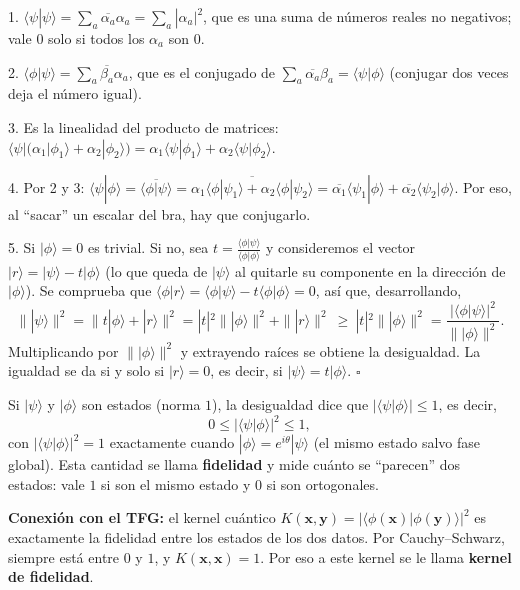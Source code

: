 \documentclass[11pt, a4paper, twoside, openright]{report}
\begin{document}
\begin{tcolorbox}[colback=gray!5!white,colframe=gray!75!black,title=\textbf{Demostración}]
1. $\langle\psi|\psi\rangle = \sum_a\overline{\alpha_a}\alpha_a = \sum_a|\alpha_a|^2$, que es una suma de números reales no negativos; vale $0$ solo si todos los $\alpha_a$ son $0$.

2. $\langle\phi|\psi\rangle = \sum_a\overline{\beta_a}\alpha_a$, que es el conjugado de $\sum_a\overline{\alpha_a}\beta_a = \langle\psi|\phi\rangle$ (conjugar dos veces deja el número igual).

3. Es la linealidad del producto de matrices: $\langle\psi|\big(\alpha_1|\phi_1\rangle + \alpha_2|\phi_2\rangle\big) = \alpha_1\langle\psi|\phi_1\rangle + \alpha_2\langle\psi|\phi_2\rangle$.

4. Por 2 y 3: $\langle\psi|\phi\rangle = \overline{\langle\phi|\psi\rangle} = \overline{\alpha_1\langle\phi|\psi_1\rangle + \alpha_2\langle\phi|\psi_2\rangle} = \overline{\alpha_1}\langle\psi_1|\phi\rangle + \overline{\alpha_2}\langle\psi_2|\phi\rangle$. Por eso, al ``sacar'' un escalar del bra, hay que conjugarlo.

5. Si $|\phi\rangle = 0$ es trivial. Si no, sea $t = \frac{\langle\phi|\psi\rangle}{\langle\phi|\phi\rangle}$ y consideremos el vector $|r\rangle = |\psi\rangle - t|\phi\rangle$ (lo que queda de $|\psi\rangle$ al quitarle su componente en la dirección de $|\phi\rangle$). Se comprueba que $\langle\phi|r\rangle = \langle\phi|\psi\rangle - t\langle\phi|\phi\rangle = 0$, así que, desarrollando,
\[ \||\psi\rangle\|^2 = \|t|\phi\rangle + |r\rangle\|^2 = |t|^2\||\phi\rangle\|^2 + \||r\rangle\|^2 \ \ge\ |t|^2\||\phi\rangle\|^2 = \frac{|\langle\phi|\psi\rangle|^2}{\||\phi\rangle\|^2}. \]
Multiplicando por $\||\phi\rangle\|^2$ y extrayendo raíces se obtiene la desigualdad. La igualdad se da si y solo si $|r\rangle = 0$, es decir, si $|\psi\rangle = t|\phi\rangle$. \hfill $\square$
\end{tcolorbox}

\begin{tcolorbox}[colback=blue!5!white,colframe=blue!75!black,title=\textbf{Nota Aclaratoria: Qué dice Cauchy--Schwarz sobre estados cuánticos}]
Si $|\psi\rangle$ y $|\phi\rangle$ son estados (norma $1$), la desigualdad dice que $|\langle\psi|\phi\rangle|\le1$, es decir,
\[ 0 \le |\langle\psi|\phi\rangle|^2 \le 1, \]
con $|\langle\psi|\phi\rangle|^2 = 1$ exactamente cuando $|\phi\rangle = e^{i\theta}|\psi\rangle$ (el mismo estado salvo fase global). Esta cantidad se llama \textbf{fidelidad} y mide cuánto se ``parecen'' dos estados: vale $1$ si son el mismo estado y $0$ si son ortogonales.

\textbf{Conexión con el TFG:} el kernel cuántico $K(\mathbf{x},\mathbf{y}) = |\langle\phi(\mathbf{x})|\phi(\mathbf{y})\rangle|^2$ es exactamente la fidelidad entre los estados de los dos datos. Por Cauchy--Schwarz, siempre está entre $0$ y $1$, y $K(\mathbf{x},\mathbf{x}) = 1$. Por eso a este kernel se le llama \textbf{kernel de fidelidad}.
\end{tcolorbox}
\end{document}
